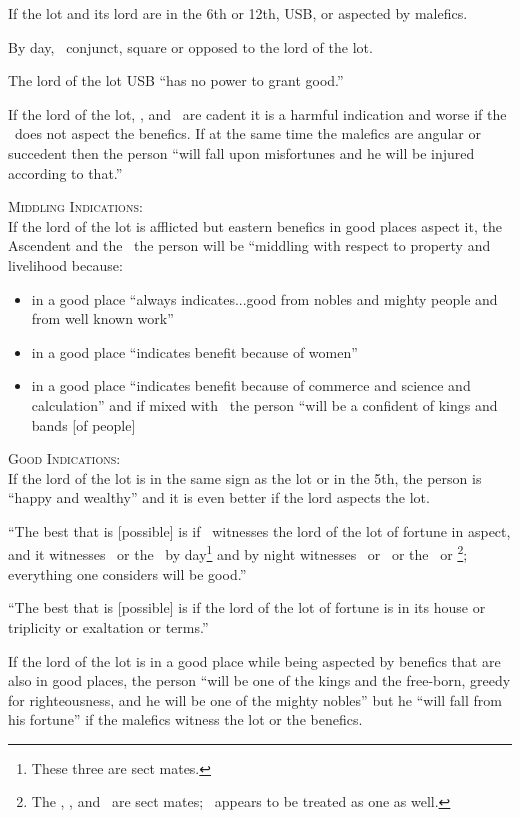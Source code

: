 If the lot and its lord are in the 6th or 12th, USB, or aspected by malefics.

By day, \Mars\, conjunct, square or opposed to the lord of the lot.

The lord of the lot USB ``has no power to grant good.''

If the lord of the lot, \Jupiter, and \Venus\, are cadent it is a harmful indication and worse if the \Moon\, does not aspect the benefics. If at the same time the malefics are angular or succedent then the person ``will fall upon misfortunes and he will be injured according to that.''

\noindent\textsc{Middling Indications:} \hfill \\
If the lord of the lot is afflicted but eastern benefics in good places aspect it, the Ascendent and the \Moon\, the person will be ``middling with respect to property and livelihood because:
\begin{itemize}[topsep=0em,itemsep=0em]
\item[\Jupiter] in a good place ``always indicates...good from nobles and mighty people and from well known work''
\item[\Venus] in a good place ``indicates benefit because of women''
\item[\Mercury] in a good place ``indicates benefit because of commerce and science and calculation'' and if mixed with \Jupiter\, the person ``will be a confident of kings and bands [of people]
\end{itemize}

\noindent\textsc{Good Indications:} \hfill \\
If the lord of the lot is in the same sign as the lot or in the 5th, the person is ``happy and wealthy'' and it is even better if the lord aspects the lot.

``The best that is [possible] is if \Saturn\, witnesses the lord of the lot of fortune in aspect, and it witnesses \Jupiter\, or the \Sun\, by day\footnote{These three are sect mates.} and by night witnesses \Mars\, or \Venus\, or the \Moon\, or \Mercury\footnote{The \Moon, \Venus, and \Mars\, are sect mates; \Mercury\, appears to be treated as one as well.}; everything one considers will be good.''

``The best that is [possible] is if the lord of the lot of fortune is in its house or triplicity or exaltation or terms.''

If the lord of the lot is in a good place while being aspected by benefics that are also in good places, the person ``will be one of the kings and the free-born, greedy for righteousness, and he will be one of the mighty nobles'' but he ``will fall from his fortune'' if the malefics witness the lot or the benefics.







